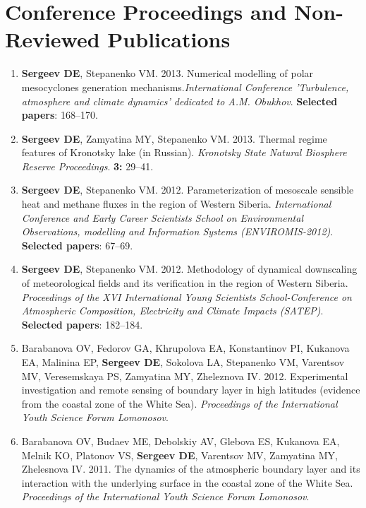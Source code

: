 \documentclass[a4paper,11pt]{article}
\makeatletter
\newlength{\bibhang}
\newlength{\bibsep}
 {\@listi \global\bibsep\itemsep \global\advance\bibsep by\parsep}
\newenvironment{bibsection}%
        {\begin{enumerate}{}{%
       \setlength{\leftmargin}{\bibhang}%
       \setlength{\itemindent}{-\leftmargin}%
       \setlength{\itemsep}{\bibsep}%
       \setlength{\parsep}{\z@}%
        \setlength{\partopsep}{0pt}%
        \setlength{\topsep}{0pt}}}
        {\end{enumerate}\vspace{-.6\baselineskip}}
\makeatother
\begin{document}
\section{Conference Proceedings and Non-Reviewed Publications}
\begin{bibsection}
    \item {\bf Sergeev DE}, Stepanenko VM. 2013. Numerical modelling of polar mesocyclones generation mechanisms.\emph{International Conference 'Turbulence, atmosphere and climate dynamics' dedicated to A.M. Obukhov}. {\bf Selected papers}: 168--170.
    \item {\bf Sergeev DE}, Zamyatina MY, Stepanenko VM. 2013. Thermal regime features of Kronotsky lake (in Russian). \emph{Kronotsky State Natural Biosphere Reserve Proceedings}. \textbf{3:} 29--41.
    \item {\bf Sergeev DE}, Stepanenko VM. 2012. Parameterization of mesoscale sensible heat and methane fluxes in the region of Western Siberia. \emph{International Conference and Early Career Scientists School on Environmental Observations, modelling and Information Systems (ENVIROMIS-2012)}. {\bf Selected papers}: 67--69.
    \item {\bf Sergeev DE}, Stepanenko VM. 2012. Methodology of dynamical downscaling of meteorological fields and its verification in the region of Western Siberia. \emph{Proceedings of the XVI International Young Scientists School-Conference on Atmospheric Composition, Electricity and Climate Impacts (SATEP)}. {\bf Selected papers}: 182--184.
    \item Barabanova OV, Fedorov GA, Khrupolova EA, Konstantinov PI, Kukanova EA, Malinina EP, {\bf Sergeev DE}, Sokolova LA, Stepanenko VM, Varentsov MV, Veresemskaya PS, Zamyatina MY, Zheleznova IV. 2012. Experimental investigation and remote sensing of boundary layer in high latitudes (evidence from the coastal zone of the White Sea). \emph{Proceedings of the International Youth Science Forum Lomonosov}.
    \item Barabanova OV, Budaev ME, Debolskiy AV, Glebova ES, Kukanova EA, Melnik KO, Platonov VS,  {\bf Sergeev DE}, Varentsov MV, Zamyatina MY, Zhelesnova IV. 2011. The dynamics of the atmospheric boundary layer and its interaction with the underlying surface in the coastal zone of the White Sea. \emph{Proceedings of the International Youth Science Forum Lomonosov}.
\end{bibsection}
\end{document}

